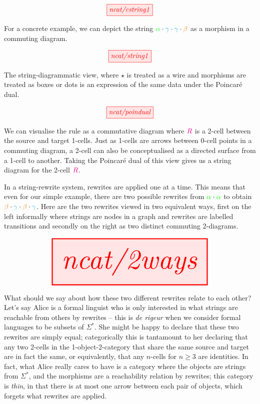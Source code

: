 \begin{marginfigure}
\centering
\[\tikzfig{ncat/cstring1}\]
\caption{For a concrete example, we can depict the string $\textcolor{green}{\alpha} \cdot \textcolor{cyan}{\gamma} \cdot \textcolor{cyan}{\gamma} \cdot \textcolor{orange}{\beta}$ as a morphism in a commuting diagram.}
\end{marginfigure}

\begin{marginfigure}
\centering
\[\tikzfig{ncat/string1}\]
\caption{The string-diagrammatic view, where $\star$ is treated as a wire and morphisms are treated as boxes or dots is an expression of the same data under the Poincar\'{e} dual.}
\end{marginfigure}

\begin{marginfigure}\label{fig:ruleR}
\centering
\[\tikzfig{ncat/poindual}\]
\caption{We can visualise the rule as a commutative diagram where $\textcolor{magenta}{R}$ is a 2-cell between the source and target 1-cells. Just as 1-cells are arrows between 0-cell points in a commuting diagram, a 2-cell can also be conceptualised as a directed surface from a 1-cell to another. Taking the Poincar\'{e} dual of this view gives us a string diagram for the 2-cell $\textcolor{magenta}{R}$.}
\end{marginfigure}

 In a string-rewrite system, rewrites are applied one at a time. This means that even for our simple example, there are two possible rewrites from $\textcolor{green}{\alpha} \cdot \textcolor{green}{\alpha}$ to obtain $\textcolor{orange}{\beta} \cdot \textcolor{cyan}{\gamma} \cdot \textcolor{orange}{\beta} \cdot \textcolor{cyan}{\gamma}$. Here are the two rewrites viewed in two equivalent ways, first on the left informally where strings are nodes in a graph and rewrites are labelled transitions and secondly on the right as two distinct commuting 2-diagrams.

\[\resizebox{0.8\textwidth}{!}{\tikzfig{ncat/2ways}}\]

What should we say about how these two different rewrites relate to each other? Let's say Alice is a formal linguist who is only interested in what strings are reachable from others by rewrites -- this is \emph{de rigeur} when we consider formal languages to be subsets of $\Sigma^*$. She might be happy to declare that these two rewrites are simply equal; categorically this is tantamount to her declaring that any two 2-cells in the 1-object-2-category that share the same source and target are in fact the same, or equivalently, that any $n$-cells for $n \geq 3$ are identities. In fact, what Alice really cares to have is a category where the objects are strings from $\Sigma^*$, and the morphisms are a reachability relation by rewrites; this category is \emph{thin}, in that there is at most one arrow between each pair of objects, which forgets what rewrites are applied.

